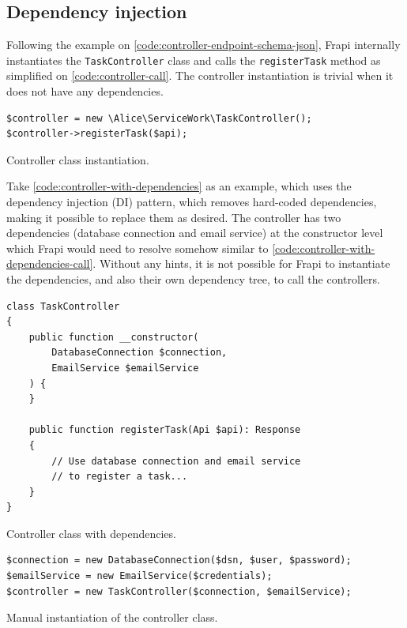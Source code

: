 \subsection{Dependency injection}
\label{sec:dependency-injection}

Following the example on \autoref{code:controller-endpoint-schema-json}, Frapi internally instantiates the \texttt{TaskController} class and calls the \texttt{registerTask} method as simplified on \autoref{code:controller-call}. The controller instantiation is trivial when it does not have any dependencies.

\begin{listing}[htbp]
\begin{verbatim}
$controller = new \Alice\ServiceWork\TaskController();
$controller->registerTask($api);
\end{verbatim}
\caption{Controller class instantiation.}
\label{code:controller-call}
\end{listing}

Take \autoref{code:controller-with-dependencies} as an example, which uses the dependency injection (DI) \cite{php-the-right-way-di} pattern, which removes hard-coded dependencies, making it possible to replace them as desired. The controller has two dependencies (database connection and email service) at the constructor level which Frapi would need to resolve somehow similar to \autoref{code:controller-with-dependencies-call}. Without any hints, it is not possible for Frapi to instantiate the dependencies, and also their own dependency tree, to call the controllers.

\begin{listing}[htbp]
\begin{verbatim}
class TaskController
{
	public function __constructor(
		DatabaseConnection $connection,
		EmailService $emailService
	) {
	}

	public function registerTask(Api $api): Response
	{
		// Use database connection and email service
		// to register a task...
	}
}
\end{verbatim}
\caption{Controller class with dependencies.}
\label{code:controller-with-dependencies}
\end{listing}

\begin{listing}[htbp]
\begin{verbatim}
$connection = new DatabaseConnection($dsn, $user, $password);
$emailService = new EmailService($credentials);
$controller = new TaskController($connection, $emailService);
\end{verbatim}
\caption{Manual instantiation of the controller class.}
\label{code:controller-with-dependencies-call}
\end{listing}

